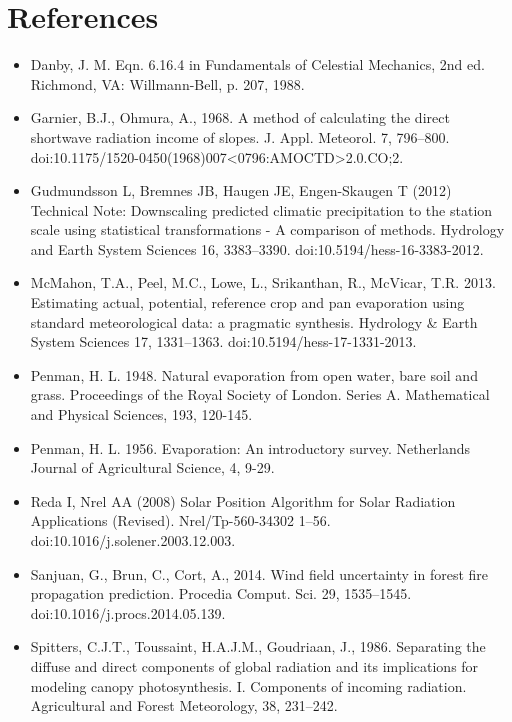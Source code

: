 \documentclass[11pt,a4paper]{article}
\begin{document}
\section{References}
\begin{itemize}
\item{Danby, J. M. Eqn. 6.16.4 in Fundamentals of Celestial Mechanics, 2nd ed. Richmond, VA: Willmann-Bell, p. 207, 1988.}

\item{Garnier, B.J., Ohmura, A., 1968. A method of calculating the direct shortwave radiation income of slopes. J. Appl. Meteorol. 7, 796–800. doi:10.1175/1520-0450(1968)007<0796:AMOCTD>2.0.CO;2.}

\item{Gudmundsson L, Bremnes JB, Haugen JE, Engen-Skaugen T (2012) Technical Note: Downscaling predicted climatic precipitation to the station scale using statistical transformations - A comparison of methods. Hydrology and Earth System Sciences 16, 3383–3390. doi:10.5194/hess-16-3383-2012.}

\item{McMahon, T.A., Peel, M.C., Lowe, L., Srikanthan, R., McVicar, T.R. 2013. Estimating actual, potential, reference crop and pan evaporation using standard meteorological data: a pragmatic synthesis. Hydrology \& Earth System Sciences 17, 1331–1363. doi:10.5194/hess-17-1331-2013.}

\item{Penman, H. L. 1948. Natural evaporation from open water, bare soil and grass. Proceedings of the Royal Society of London. Series A. Mathematical and Physical Sciences, 193, 120-145.}

\item{Penman, H. L. 1956. Evaporation: An introductory survey. Netherlands Journal of Agricultural Science, 4, 9-29.}

\item{Reda I, Nrel AA (2008) Solar Position Algorithm for Solar Radiation Applications (Revised). Nrel/Tp-560-34302 1–56. doi:10.1016/j.solener.2003.12.003.}

\item{Sanjuan, G., Brun, C., Cort, A., 2014. Wind field uncertainty in forest fire propagation prediction. Procedia Comput. Sci. 29, 1535–1545. doi:10.1016/j.procs.2014.05.139.}

\item{Spitters, C.J.T., Toussaint, H.A.J.M., Goudriaan, J., 1986. Separating the diffuse and direct components of global radiation and its implications for modeling canopy photosynthesis. I. Components of incoming radiation. Agricultural and Forest Meteorology, 38, 231–242.}


\end{itemize}
\end{document}

